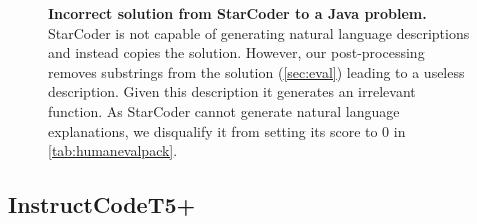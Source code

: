 \begin{figure}[htbp]
\hrulefill

\caption{\textbf{Incorrect solution from StarCoder to a \evale{} Java problem.} StarCoder is not capable of generating natural language descriptions and instead copies the solution. However, our post-processing removes substrings from the solution (\autoref{sec:eval}) leading to a useless description. Given this description it generates an irrelevant function. As StarCoder cannot generate natural language explanations, we disqualify it from \evale{} setting its score to 0 in \autoref{tab:humanevalpack}.}
\label{fig:starcoderjava}
\end{figure}


\FloatBarrier


\subsection{InstructCodeT5+}
\label{sec:examplesinstructcodet5p}

